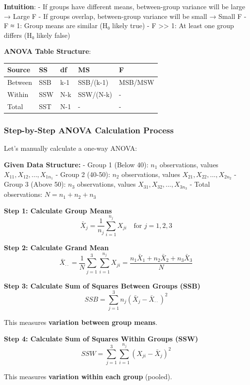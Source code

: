 \documentclass[11pt]{article}
\begin{document}
\textbf{Intuition}: - If groups have different means, between-group
variance will be large → Large F - If groups overlap, between-group
variance will be small → Small F - F ≈ 1: Group means are similar (H₀
likely true) - F \textgreater\textgreater{} 1: At least one group
differs (H₀ likely false)

\textbf{ANOVA Table Structure}:

\begin{longtable}[]{@{}lllll@{}}
\toprule\noalign{}
Source & SS & df & MS & F \\
\midrule\noalign{}
\endhead
\bottomrule\noalign{}
\endlastfoot
Between & SSB & k-1 & SSB/(k-1) & MSB/MSW \\
Within & SSW & N-k & SSW/(N-k) & - \\
Total & SST & N-1 & - & - \\
\end{longtable}

    \subsubsection{\texorpdfstring{\textbf{Step-by-Step ANOVA Calculation
Process}}{Step-by-Step ANOVA Calculation Process}}\label{step-by-step-anova-calculation-process}

Let's manually calculate a one-way ANOVA:

\textbf{Given Data Structure:} - Group 1 (Below 40): \(n_1\)
observations, values \(X_{11}, X_{12}, ..., X_{1n_1}\) - Group 2
(40-50): \(n_2\) observations, values \(X_{21}, X_{22}, ..., X_{2n_2}\)
- Group 3 (Above 50): \(n_3\) observations, values
\(X_{31}, X_{32}, ..., X_{3n_3}\) - Total observations:
\(N = n_1 + n_2 + n_3\)

\textbf{Step 1: Calculate Group Means}
\[\bar{X}_j = \frac{1}{n_j}\sum_{i=1}^{n_j} X_{ji} \quad \text{for } j = 1, 2, 3\]

\textbf{Step 2: Calculate Grand Mean}
\[\bar{X}_{\cdot\cdot} = \frac{1}{N}\sum_{j=1}^{3}\sum_{i=1}^{n_j} X_{ji} = \frac{n_1\bar{X}_1 + n_2\bar{X}_2 + n_3\bar{X}_3}{N}\]

\textbf{Step 3: Calculate Sum of Squares Between Groups (SSB)}
\[SSB = \sum_{j=1}^{3} n_j(\bar{X}_j - \bar{X}_{\cdot\cdot})^2\]

This measures \textbf{variation between group means}.

\textbf{Step 4: Calculate Sum of Squares Within Groups (SSW)}
\[SSW = \sum_{j=1}^{3}\sum_{i=1}^{n_j}(X_{ji} - \bar{X}_j)^2\]

This measures \textbf{variation within each group} (pooled).
\end{document}
